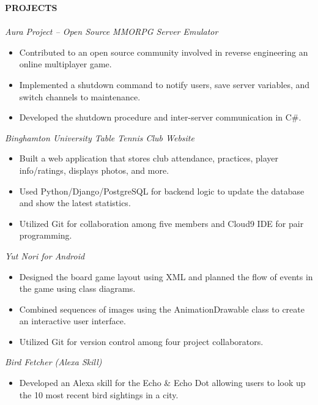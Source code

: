 \documentclass[10.5pt]{res}
\newcommand{\itemSpace}{\vspace{-8pt}}
\begin{document}
\begin{resume}
\textbf{PROJECTS} \\ [-10.5pt]
\noindent\makebox[\linewidth]{\rule{\textwidth}{0.4pt}}\\
{\it Aura Project – Open Source MMORPG Server Emulator}\\ [-11pt]  
	\begin{itemize} \itemsep -1pt %
	\item Contributed to an open source community involved in reverse engineering an online multiplayer game.
 	\item Implemented a shutdown command to notify users, save server variables, and switch channels to maintenance.
	\item Developed the shutdown procedure and inter-server communication in C\#.
	\end{itemize}
	\itemSpace
{\it Binghamton University Table Tennis Club Website} \\ [-11pt]  
	\begin{itemize} \itemsep -1pt %
	\item Built a web application that stores club attendance, practices, player info/ratings, displays photos, and more.
 	\item Used Python/Django/PostgreSQL for backend logic to update the database and show the latest statistics.
	\item Utilized Git for collaboration among five members and Cloud9 IDE for pair programming.
	\end{itemize}
	\itemSpace
{\it Yut Nori for Android} \\ [-11pt]  
	\begin{itemize} \itemsep -1pt %
	\item Designed the board game layout using XML and planned the flow of events in the game using class diagrams.
 	\item Combined sequences of images using the AnimationDrawable class to create an interactive user interface.
	\item Utilized Git for version control among four project collaborators.
	\end{itemize}
	\itemSpace
{\it Bird Fetcher (Alexa Skill)}\\ [-11pt]  
	\begin{itemize} \itemsep -1pt %
	\item Developed an Alexa skill for the Echo \& Echo Dot allowing users to look up the 10 most recent bird sightings in a city.

\end{itemize}
\end{resume}
\end{document}
